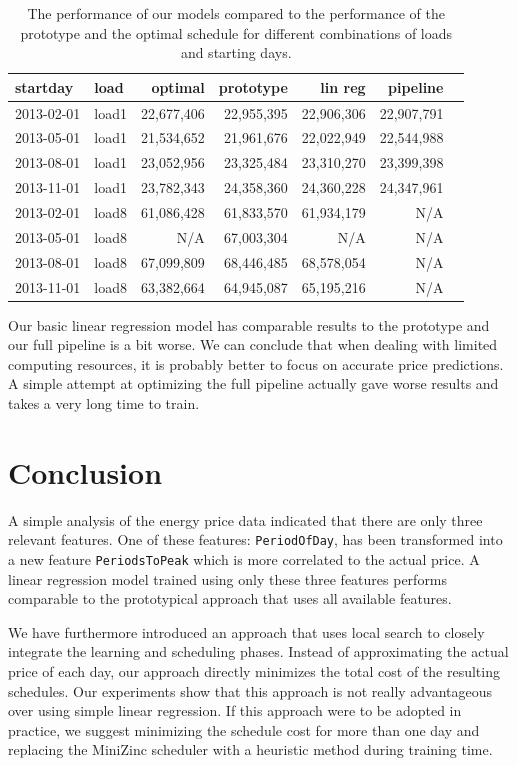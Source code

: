 \documentclass{article}
\begin{document}
\begin{table}
	\begin{tabular}{llrrrrr}
		startday & load &optimal & prototype & lin reg & pipeline \\ \midrule
		2013-02-01 & load1 & 22,677,406& 22,955,395 & 22,906,306 & 22,907,791\\
		2013-05-01 & load1 & 21,534,652& 21,961,676 & 22,022,949 & 22,544,988\\
		2013-08-01 & load1 & 23,052,956& 23,325,484 & 23,310,270 & 23,399,398\\
		2013-11-01 & load1 & 23,782,343& 24,358,360 & 24,360,228 & 24,347,961\\
		2013-02-01 & load8 & 61,086,428& 61,833,570 & 61,934,179 & N/A\\
		2013-05-01 & load8 & N/A& 67,003,304 & N/A & N/A\\
		2013-08-01 & load8 & 67,099,809& 68,446,485 & 68,578,054 & N/A\\
		2013-11-01 & load8 & 63,382,664& 64,945,087 & 65,195,216 & N/A\\
	\end{tabular}
	\caption{The performance of our models compared to the performance of the prototype and the optimal schedule for different combinations of loads and starting days.}
	\label{tab:results}
\end{table}
Our basic linear regression model has comparable results to the prototype and our full pipeline is a bit worse. We can conclude that when dealing with limited computing resources, it is probably better to focus on accurate price predictions. A simple attempt at optimizing the full pipeline actually gave worse results and takes a very long time to train. 


\section{Conclusion}


A simple analysis of the energy price data indicated that there are only three relevant features. One of these features: \verb+PeriodOfDay+, has been transformed into a new feature \verb+PeriodsToPeak+ which is more correlated to the actual price. A linear regression model trained using only these three features performs comparable to the prototypical approach that uses all available features.

We have furthermore introduced an approach that uses local search to closely integrate the learning and scheduling phases. Instead of approximating the actual price of each day, our approach directly minimizes the total cost of the resulting schedules. Our experiments show that this approach is not really advantageous over using simple linear regression. If this approach were to be adopted in practice, we suggest minimizing the schedule cost for more than one day and replacing the MiniZinc scheduler with a heuristic method during training time. 



\end{document}
